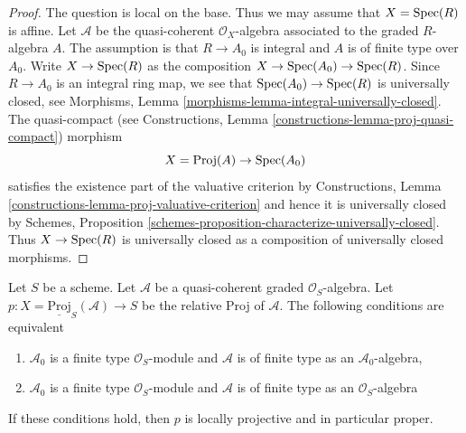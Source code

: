 \begin{proof}
The question is local on the base. Thus we may assume that $X = \mathop{\mathrm{Spec}}(R)$
is affine. Let $\mathcal{A}$ be the quasi-coherent $\mathcal{O}_X$-algebra
associated to the graded $R$-algebra $A$. The assumption is that $R \to A_0$
is integral and $A$ is of finite type over $A_0$.
Write $X \to \mathop{\mathrm{Spec}}(R)$ as the composition $X \to \mathop{\mathrm{Spec}}(A_0) \to \mathop{\mathrm{Spec}}(R)$.
Since $R \to A_0$ is an integral ring map, we see that
$\mathop{\mathrm{Spec}}(A_0) \to \mathop{\mathrm{Spec}}(R)$ is universally closed, see
Morphisms, Lemma \ref{morphisms-lemma-integral-universally-closed}.
The quasi-compact (see
Constructions, Lemma \ref{constructions-lemma-proj-quasi-compact}) morphism
$$
X = \text{Proj}(A) \to \mathop{\mathrm{Spec}}(A_0)
$$
satisfies the existence part of the valuative criterion by
Constructions, Lemma \ref{constructions-lemma-proj-valuative-criterion}
and hence it is universally closed by
Schemes, Proposition \ref{schemes-proposition-characterize-universally-closed}.
Thus $X \to \mathop{\mathrm{Spec}}(R)$ is universally closed as a composition of
universally closed morphisms.
\end{proof}

\begin{lemma}
\label{lemma-relative-proj-proper}
Let $S$ be a scheme. Let $\mathcal{A}$ be a quasi-coherent graded
$\mathcal{O}_S$-algebra. Let
$p : X = \underline{\text{Proj}}_S(\mathcal{A}) \to S$ be the relative
Proj of $\mathcal{A}$. The following conditions are equivalent
\begin{enumerate}
\item $\mathcal{A}_0$ is a finite type $\mathcal{O}_S$-module
and $\mathcal{A}$ is of finite type as an $\mathcal{A}_0$-algebra,
\item $\mathcal{A}_0$ is a finite type $\mathcal{O}_S$-module
and $\mathcal{A}$ is of finite type as an $\mathcal{O}_S$-algebra
\end{enumerate}
If these conditions hold, then $p$ is locally projective and in
particular proper.
\end{lemma}

